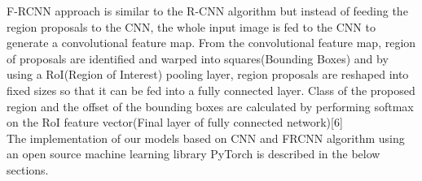 \documentclass[12pt]{article}
\begin{document}
F-RCNN approach is similar to the R-CNN algorithm but instead of feeding the region proposals to the CNN, the whole input image is fed to the CNN to generate a convolutional feature map. From the convolutional feature map, region of proposals are identified and warped into squares(Bounding Boxes) and by using a RoI(Region of Interest) pooling layer, region proposals are reshaped into fixed sizes so that it can be fed into a fully connected layer. Class of the proposed region and the offset of the bounding boxes are calculated by performing softmax on the RoI feature vector(Final layer of fully connected network)[6] \\ 

The implementation of our models based on CNN and FRCNN algorithm using an open source machine learning library PyTorch is described in the below sections. 

\newpage
\end{document}
